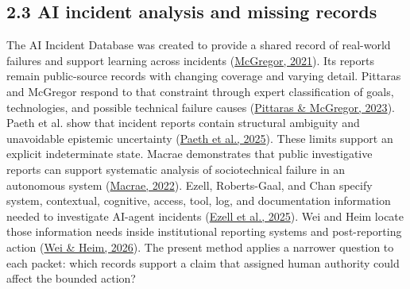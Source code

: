 \documentclass[11pt]{article}
\begin{document}
\subsection*{2.3 AI incident analysis and missing records}
The AI Incident Database was created to provide a shared record of real-world failures and support learning across incidents (\href{https://doi.org/10.1609/aaai.v35i17.17817}{McGregor, 2021}). Its reports remain public-source records with changing coverage and varying detail. Pittaras and McGregor respond to that constraint through expert classification of goals, technologies, and possible technical failure causes (\href{https://ceur-ws.org/Vol-3381/17.pdf}{Pittaras \& McGregor, 2023}). Paeth et al. show that incident reports contain structural ambiguity and unavoidable epistemic uncertainty (\href{https://doi.org/10.1609/aaai.v39i28.35163}{Paeth et al., 2025}). These limits support an explicit indeterminate state.
Macrae demonstrates that public investigative reports can support systematic analysis of sociotechnical failure in an autonomous system (\href{https://doi.org/10.1111/risa.13850}{Macrae, 2022}). Ezell, Roberts-Gaal, and Chan specify system, contextual, cognitive, access, tool, log, and documentation information needed to investigate AI-agent incidents (\href{https://doi.org/10.1609/aies.v8i1.36596}{Ezell et al., 2025}). Wei and Heim locate those information needs inside institutional reporting systems and post-reporting action (\href{https://doi.org/10.1609/aaai.v40i44.41139}{Wei \& Heim, 2026}). The present method applies a narrower question to each packet: which records support a claim that assigned human authority could affect the bounded action?
\end{document}
